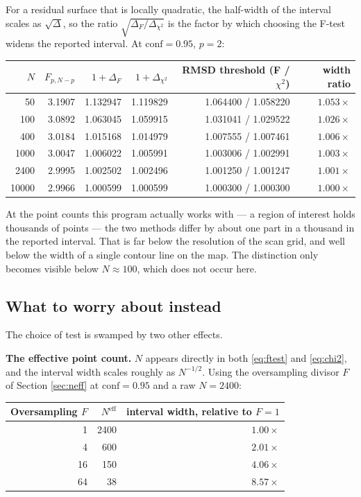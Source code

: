 \documentclass[11pt,a4paper]{article}
\begin{document}
For a residual surface that is locally quadratic, the half-width of the
interval scales as $\sqrt{\Delta}$, so the ratio
$\sqrt{\Delta_F/\Delta_{\chi^2}}$ is the factor by which choosing the
F-test widens the reported interval. At $\text{conf}=0.95$, $p=2$:

\begin{center}
\begin{tabular}{rrrrrr}
\hline
$N$ & $F_{p,N-p}$ & $1+\Delta_F$ & $1+\Delta_{\chi^2}$
& RMSD threshold (F / $\chi^2$) & width ratio \\
\hline
50      & 3.1907 & 1.132947 & 1.119829 & 1.064400 / 1.058220 & $1.053\times$ \\
100     & 3.0892 & 1.063045 & 1.059915 & 1.031041 / 1.029522 & $1.026\times$ \\
400     & 3.0184 & 1.015168 & 1.014979 & 1.007555 / 1.007461 & $1.006\times$ \\
1000    & 3.0047 & 1.006022 & 1.005991 & 1.003006 / 1.002991 & $1.003\times$ \\
2400    & 2.9995 & 1.002502 & 1.002496 & 1.001250 / 1.001247 & $1.001\times$ \\
10000   & 2.9966 & 1.000599 & 1.000599 & 1.000300 / 1.000300 & $1.000\times$ \\
\hline
\end{tabular}
\end{center}

At the point counts this program actually works with --- a region of
interest holds thousands of points --- the two methods differ by about one
part in a thousand in the reported interval. That is far below the
resolution of the scan grid, and well below the width of a single contour
line on the map. The distinction only becomes visible below $N\approx 100$,
which does not occur here.

\subsection{What to worry about instead}

The choice of test is swamped by two other effects.

\textbf{The effective point count.} $N$ appears directly in both
\eqref{eq:ftest} and \eqref{eq:chi2}, and the interval width scales roughly
as $N^{-1/2}$. Using the oversampling divisor $F$ of
Section \ref{sec:neff} at $\text{conf}=0.95$ and a raw $N=2400$:

\begin{center}
\begin{tabular}{rrr}
\hline
Oversampling $F$ & $N^{\text{eff}}$ & interval width, relative to $F=1$ \\
\hline
1  & 2400 & $1.00\times$ \\
4  & 600  & $2.01\times$ \\
16 & 150  & $4.06\times$ \\
64 & 38   & $8.57\times$ \\
\hline
\end{tabular}
\end{center}
\end{document}
